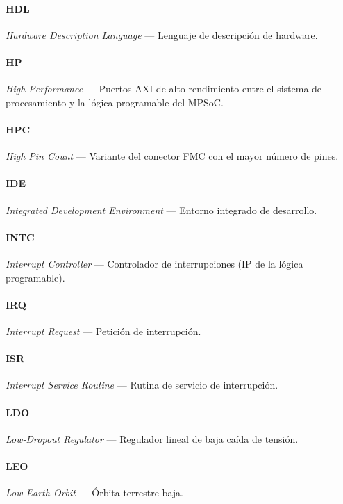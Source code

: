 \paragraph{HDL} \textit{Hardware Description Language} --- Lenguaje de descripción de hardware.

\paragraph{HP} \textit{High Performance} --- Puertos AXI de alto rendimiento entre el sistema de procesamiento y la lógica programable del MPSoC.

\paragraph{HPC} \textit{High Pin Count} --- Variante del conector FMC con el mayor número de pines.

\paragraph{IDE} \textit{Integrated Development Environment} --- Entorno integrado de desarrollo.

\paragraph{INTC} \textit{Interrupt Controller} --- Controlador de interrupciones (IP de la lógica programable).

\paragraph{IRQ} \textit{Interrupt Request} --- Petición de interrupción.

\paragraph{ISR} \textit{Interrupt Service Routine} --- Rutina de servicio de interrupción.

\paragraph{LDO} \textit{Low-Dropout Regulator} --- Regulador lineal de baja caída de tensión.

\paragraph{LEO} \textit{Low Earth Orbit} --- Órbita terrestre baja.

